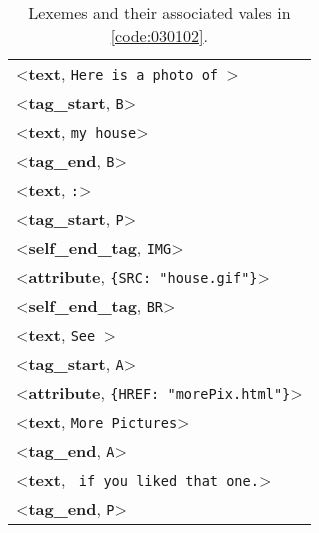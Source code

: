\begin{table}[!ht]
    \centering
    \begin{tabular}{l}
        <\textbf{text}, \texttt{Here is a photo of }> \\
        <\textbf{tag\_start}, \texttt{B}> \\
        <\textbf{text}, \texttt{my house}> \\
        <\textbf{tag\_end}, \texttt{B}> \\
        <\textbf{text}, \texttt{:}> \\
        <\textbf{tag\_start}, \texttt{P}> \\
        <\textbf{self\_end\_tag}, \texttt{IMG}> \\
        <\textbf{attribute}, \texttt{\{SRC: "house.gif"\}}> \\
        <\textbf{self\_end\_tag}, \texttt{BR}> \\
        <\textbf{text}, \texttt{See }> \\
        <\textbf{tag\_start}, \texttt{A}> \\
        <\textbf{attribute}, \texttt{\{HREF: "morePix.html"\}}> \\
        <\textbf{text}, \texttt{More Pictures}> \\
        <\textbf{tag\_end}, \texttt{A}> \\
        <\textbf{text}, \texttt{ if you liked that one.}> \\
        <\textbf{tag\_end}, \texttt{P}> \\
    \end{tabular}
    \caption{Lexemes and their associated vales in \cref{code:030102}.}
    \label{tab:030102}
\end{table}
